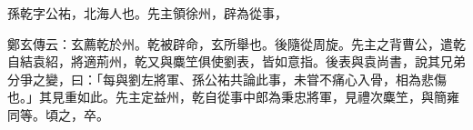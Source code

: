 
\begin{pinyinscope}
孫乾字公祐，北海人也。先主領徐州，辟為從事，

鄭玄傳云：玄薦乾於州。乾被辟命，玄所舉也。後隨從周旋。先主之背曹公，遣乾自結袁紹，將適荊州，乾又與麋笁俱使劉表，皆如意指。後表與袁尚書，說其兄弟分爭之變，曰：「每與劉左將軍、孫公祐共論此事，未甞不痛心入骨，相為悲傷也。」其見重如此。先主定益州，乾自從事中郎為秉忠將軍，見禮次麋笁，與簡雍同等。頃之，卒。


\end{pinyinscope}